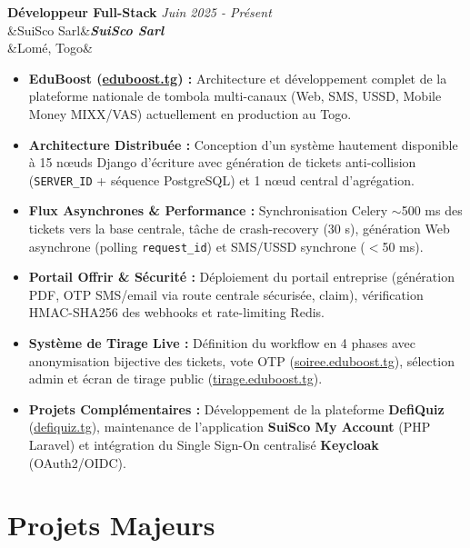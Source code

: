 \documentclass[11pt, a4paper]{article}
\newcommand{\cventry}[4]{%
  \needspace{3\baselineskip}%
  \noindent\textbf{\large #1} \hfill {\small\color{secondary}\textit{#2}}\\[2pt]%
  \ifx&#3&\else\noindent\textbf{\textit{#3}}\\[3pt]\fi
  \ifx&#4&\else\noindent{#4}\fi
  \vspace{6pt}\par
}
\begin{document}
\cventry{Développeur Full-Stack}{Juin 2025 - Présent}{SuiSco Sarl}{Lomé, Togo}
\begin{itemize}
  \item \textbf{EduBoost (\href{https://www.eduboost.tg}{eduboost.tg}) :} Architecture et développement complet de la plateforme nationale de tombola multi-canaux (Web, SMS, USSD, Mobile Money MIXX/VAS) actuellement en production au Togo.
  \item \textbf{Architecture Distribuée :} Conception d'un système hautement disponible à 15 nœuds Django d'écriture avec génération de tickets anti-collision (\texttt{SERVER\_ID} + séquence PostgreSQL) et 1 nœud central d'agrégation.
  \item \textbf{Flux Asynchrones \& Performance :} Synchronisation Celery $\sim$500 ms des tickets vers la base centrale, tâche de crash-recovery (30 s), génération Web asynchrone (polling \texttt{request\_id}) et SMS/USSD synchrone ($<$50 ms).
  \item \textbf{Portail Offrir \& Sécurité :} Déploiement du portail entreprise (génération PDF, OTP SMS/email via route centrale sécurisée, claim), vérification HMAC-SHA256 des webhooks et rate-limiting Redis.
  \item \textbf{Système de Tirage Live :} Définition du workflow en 4 phases avec anonymisation bijective des tickets, vote OTP (\href{https://soiree.eduboost.tg}{soiree.eduboost.tg}), sélection admin et écran de tirage public (\href{https://tirage.eduboost.tg}{tirage.eduboost.tg}).
  \item \textbf{Projets Complémentaires :} Développement de la plateforme \textbf{DefiQuiz} (\href{https://defiquiz.tg/}{defiquiz.tg}), maintenance de l'application \textbf{SuiSco My Account} (PHP Laravel) et intégration du Single Sign-On centralisé \textbf{Keycloak} (OAuth2/OIDC).
\end{itemize}

\section{Projets Majeurs}
\end{document}
